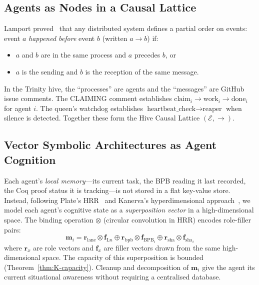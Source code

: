 \subsection{Agents as Nodes in a Causal Lattice}
\label{ssec:K-causal-lattice}

Lamport proved~\cite{lamport_time_clocks} that any distributed system
defines a partial order on events: event $a$ \emph{happened before}
event $b$ (written $a \to b$) if:
\begin{itemize}
  \item $a$ and $b$ are in the same process and $a$ precedes $b$, or
  \item $a$ is the sending and $b$ is the reception of the same
        message.
\end{itemize}
In the Trinity hive, the ``processes'' are agents and the ``messages''
are GitHub issue comments. The CLAIMING comment establishes
$\text{claim}_{i} \to \text{work}_{i} \to \text{done}_{i}$ for agent
$i$. The queen's watchdog establishes
$\text{heartbeat\_check} \to \text{reaper}$ when silence is detected.
Together these form the Hive Causal Lattice $(\mathcal{E}, \to)$.

\subsection{Vector Symbolic Architectures as Agent Cognition}
\label{ssec:K-vsa-intuition}

Each agent's \emph{local memory}---its current task, the BPB reading it
last recorded, the Coq proof status it is tracking---is not stored in a
flat key-value store. Instead, following Plate's
HRR~\cite{plate_hrr} and Kanerva's hyperdimensional
approach~\cite{kanerva_hyperdimensional}, we model each agent's
cognitive state as a \emph{superposition vector} in a high-dimensional
space. The binding operation $\otimes$ (circular convolution in HRR)
encodes role-filler pairs:
\[
  \mathbf{m}_i = \mathbf{r}_{\text{lane}} \otimes \mathbf{f}_{\text{L}n}
               \oplus \mathbf{r}_{\text{bpb}}  \otimes \mathbf{f}_{\text{BPB}_i}
               \oplus \mathbf{r}_{\text{sha}}  \otimes \mathbf{f}_{\text{sha}_i}
\]
where $\mathbf{r}_x$ are role vectors and $\mathbf{f}_x$ are filler
vectors drawn from the same high-dimensional space. The capacity of this
superposition is bounded (Theorem~\ref{thm:K-capacity}). Cleanup and
decomposition of $\mathbf{m}_i$ give the agent its current situational
awareness without requiring a centralised database.


